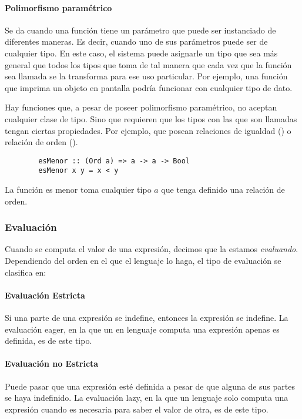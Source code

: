 \paragraph{Polimorfismo paramétrico} Se da cuando una función tiene un parámetro que puede ser instanciado de diferentes maneras. Es decir, cuando uno de sus parámetros puede ser de cualquier tipo. En este caso, el sistema puede asignarle un tipo que sea más general que todos los tipos que toma de tal manera que cada vez que la función sea llamada se la transforma para ese uso particular. Por ejemplo, una función que imprima un objeto en pantalla podría funcionar con cualquier tipo de dato.

Hay funciones que, a pesar de poseer polimorfismo paramétrico, no aceptan cualquier clase de tipo. Sino que requieren que los tipos con las que son llamadas tengan ciertas propiedades. Por ejemplo, que posean relaciones de igualdad () o relación de orden ().

\begin{centrado}
	\begin{verbatim}
		esMenor :: (Ord a) => a -> a -> Bool
		esMenor x y = x < y
	\end{verbatim}
\end{centrado} 
La función es menor toma cualquier tipo $a$ que tenga definido una relación de orden.

\subsubsection{Evaluación}
Cuando se computa el valor de una expresión, decimos que la estamos \textit{evaluando}. Dependiendo del orden en el que el lenguaje lo haga, el tipo de evaluación se  clasifica en:

\paragraph{Evaluación Estricta} Si una parte de una expresión se indefine, entonces la expresión se indefine. La evaluación eager, en la que un en lenguaje computa una expresión apenas es definida, es de este tipo. 

\paragraph{Evaluación no Estricta} Puede pasar que una expresión esté definida a pesar de que alguna de sus partes se haya indefinido. La evaluación lazy, en la que un lenguaje solo computa una expresión cuando es necesaria para saber el valor de otra, es de este tipo.

